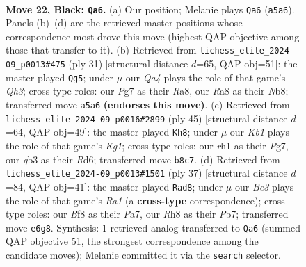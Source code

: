 \documentclass[11pt]{article}
\begin{document}
\clearpage

\begin{figure}[p]\centering
\begin{subfigure}{0.46\textwidth}\centering
\resizebox{\linewidth}{!}{%
\newchessgame
\chessboard[
  setfen={rk3b1r/pp4pp/2p1b3/q2p1p2/P2P3P/1Q2PN2/1PKB1PP1/1R5R b - - 2 22},
  showmover=false,
  pgfstyle=straightmove, color=movearrow, markmove={a5-a6}
]}
\caption{}
\end{subfigure}\hfill
\begin{subfigure}{0.46\textwidth}\centering
\resizebox{\linewidth}{!}{%
\newchessgame
\chessboard[
  setfen={rn4kr/5p1p/pp1pb1pq/3p4/B2P2N1/5Q2/PP3PPP/R4RK1 b - - 3 16},
  showmover=false,
  pgfstyle=straightmove, color=movearrow, markmove={h6-g5}
]}
\caption{}
\end{subfigure}
\\[4pt]
\begin{subfigure}{0.46\textwidth}\centering
\resizebox{\linewidth}{!}{%
\newchessgame
\chessboard[
  setfen={4r1k1/p5pp/3rpp2/5b2/2QP3P/1PPNp1q1/P3P1P1/2RK1B1R b - - 2 23},
  showmover=false,
  pgfstyle=straightmove, color=movearrow, markmove={g8-h8}
]}
\caption{}
\end{subfigure}\hfill
\begin{subfigure}{0.46\textwidth}\centering
\resizebox{\linewidth}{!}{%
\newchessgame
\chessboard[
  setfen={r3r1k1/pp2qpp1/2p4p/8/1n1bPP2/1QN3PP/PP4BK/R4R2 b - - 2 19},
  showmover=false,
  pgfstyle=straightmove, color=movearrow, markmove={a8-d8}
]}
\caption{}
\end{subfigure}
\caption{\textbf{Move 22, Black: \texttt{Qa6}.} (a) Our position; Melanie plays \texttt{Qa6} (\texttt{a5a6}). Panels (b)--(d) are the retrieved master positions whose correspondence most drove this move (highest QAP objective among those that transfer to it). (b) Retrieved from \texttt{lichess\_elite\_2024-09\_p0013\#475} (ply 31) [structural distance $d$=65, QAP obj=51]: the master played \texttt{Qg5}; under $\mu$ our \emph{Qa4} plays the role of that game's \emph{Qh3}; cross-type roles: our \emph{P}g7 as their \emph{R}a8, our \emph{R}a8 as their \emph{N}b8; transferred move \texttt{a5a6} \textbf{(endorses this move)}. (c) Retrieved from \texttt{lichess\_elite\_2024-09\_p0016\#2899} (ply 45) [structural distance $d$=64, QAP obj=49]: the master played \texttt{Kh8}; under $\mu$ our \emph{Kb1} plays the role of that game's \emph{Kg1}; cross-type roles: our \emph{r}h1 as their \emph{P}g7, our \emph{q}b3 as their \emph{R}d6; transferred move \texttt{b8c7}. (d) Retrieved from \texttt{lichess\_elite\_2024-09\_p0013\#1501} (ply 37) [structural distance $d$=84, QAP obj=41]: the master played \texttt{Rad8}; under $\mu$ our \emph{Be3} plays the role of that game's \emph{Ra1} (a \textbf{cross-type} correspondence); cross-type roles: our \emph{B}f8 as their \emph{P}a7, our \emph{R}h8 as their \emph{P}b7; transferred move \texttt{e6g8}. Synthesis: 1 retrieved analog transferred to \texttt{Qa6} (summed QAP objective 51, the strongest correspondence among the candidate moves); Melanie committed it via the \texttt{search} selector.}
\label{fig:thought-m43}
\end{figure}
\end{document}
